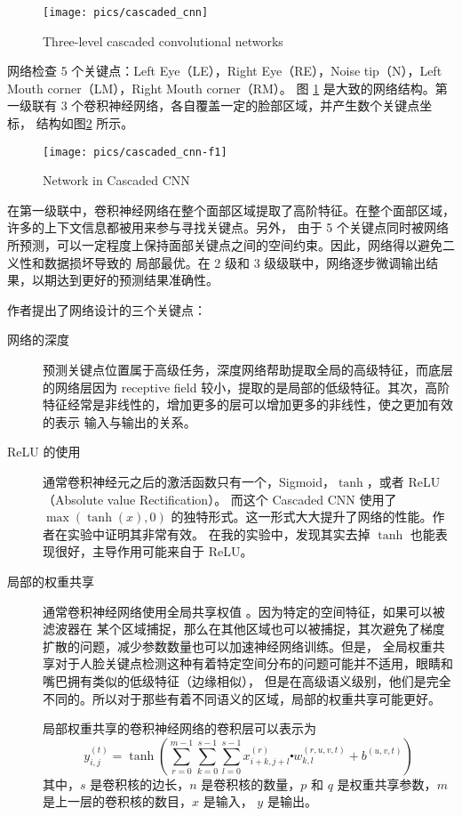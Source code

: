 \documentclass{ctexart}
\begin{document}
\begin{figure}
\centering
\texttt{[image: pics/cascaded\_cnn]}
\caption[]{Three-level cascaded convolutional networks}
\label{fig:cascaded_cnn}
\end{figure}

网络检查 5 个关键点：Left Eye（LE），Right Eye（RE），Noise tip（N），Left Mouth corner（LM），Right Mouth corner（RM）。
图 \ref{fig:cascaded_cnn} 是大致的网络结构。第一级联有 3 个卷积神经网络，各自覆盖一定的脸部区域，并产生数个关键点坐标，
结构如图\ref{fig:cascaded_cnn-f1} 所示。

\begin{figure}
	\centering
	\texttt{[image: pics/cascaded\_cnn-f1]}
	\caption[]{Network in Cascaded CNN}
	\label{fig:cascaded_cnn-f1}
\end{figure}

在第一级联中，卷积神经网络在整个面部区域提取了高阶特征。在整个面部区域，许多的上下文信息都被用来参与寻找关键点。另外，
由于 5 个关键点同时被网络所预测，可以一定程度上保持面部关键点之间的空间约束。因此，网络得以避免二义性和数据损坏导致的
局部最优。在 2 级和 3 级级联中，网络逐步微调输出结果，以期达到更好的预测结果准确性。

作者提出了网络设计的三个关键点：

\begin{description}
	\item [网络的深度] 预测关键点位置属于高级任务，深度网络帮助提取全局的高级特征，而底层的网络层因为 receptive field
	较小，提取的是局部的低级特征。其次，高阶特征经常是非线性的，增加更多的层可以增加更多的非线性，使之更加有效的表示
	输入与输出的关系。
	\item [ReLU 的使用] 通常卷积神经元之后的激活函数只有一个，Sigmoid，$\tanh$，或者 ReLU （Absolute value Rectification）。
	而这个 Cascaded CNN 使用了 $\max(\tanh(x), 0)$ 的独特形式。这一形式大大提升了网络的性能。作者在实验中证明其非常有效。
	在我的实验中，发现其实去掉 $\tanh$ 也能表现很好，主导作用可能来自于 ReLU。
	\item [局部的权重共享] 通常卷积神经网络使用全局共享权值 \cite{lff-conv}。因为特定的空间特征，如果可以被滤波器在
	某个区域捕捉，那么在其他区域也可以被捕捉，其次避免了梯度扩散的问题，减少参数数量也可以加速神经网络训练。但是，
	全局权重共享对于人脸关键点检测这种有着特定空间分布的问题可能并不适用，眼睛和嘴巴拥有类似的低级特征（边缘相似），
	但是在高级语义级别，他们是完全不同的。所以对于那些有着不同语义的区域，局部的权重共享可能更好。

	局部权重共享的卷积神经网络的卷积层可以表示为
	$$
	y_{i, j}^{(t)} = \tanh \left(
	\sum_{r=0}^{m-1} \sum_{k=0}^{s-1} \sum_{l=0}^{s-1} x_{i+k, j+l}^{(r)} \centerdot
	w_{k, l}^{(r, u, v, t)} + b^{(u, v, t)}
	\right)
	$$
	其中，$s$ 是卷积核的边长，$n$ 是卷积核的数量，$p$ 和 $q$ 是权重共享参数，$m$ 是上一层的卷积核的数目，$x$ 是输入，
	$y$ 是输出。
\end{description}
\end{document}
